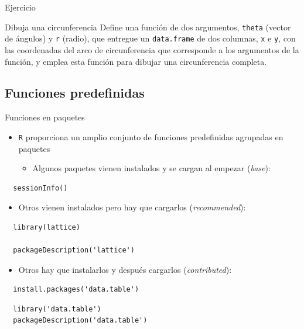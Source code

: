 \documentclass[xcolor={usenames,svgnames,dvipsnames}]{beamer}
\begin{document}
\begin{frame}[fragile,label={sec:org430984a}]{Ejercicio}
 \begin{block}{Dibuja una circunferencia}
Define una función de dos argumentos, \texttt{theta} (vector de ángulos) y
\texttt{r} (radio), que entregue un \texttt{data.frame} de dos columnas, \texttt{x} e \texttt{y},
con las coordenadas del arco de circunferencia que corresponde a los
argumentos de la función, y emplea esta función para dibujar una
circunferencia completa.
\end{block}
\end{frame}


\subsection{Funciones predefinidas}
\label{sec:org2401417}

\begin{frame}[fragile,label={sec:orgfcd5ee0}]{Funciones en paquetes}
 \begin{itemize}
\item \texttt{R} proporciona un amplio conjunto de funciones predefinidas agrupadas en paquetes

\begin{itemize}
\item Algunos paquetes vienen instalados y se cargan al empezar (\emph{base}):
\end{itemize}
\end{itemize}
\lstset{language=r,label= ,caption= ,captionpos=b,numbers=none}
\begin{lstlisting}
  sessionInfo()
\end{lstlisting}
\begin{itemize}
\item Otros vienen instalados pero hay que cargarlos (\emph{recommended}):
\end{itemize}
\lstset{language=r,label= ,caption= ,captionpos=b,numbers=none}
\begin{lstlisting}
  library(lattice)

  packageDescription('lattice')
\end{lstlisting}
\begin{itemize}
\item Otros hay que instalarlos y después cargarlos (\emph{contributed}):
\end{itemize}
\lstset{language=r,label= ,caption= ,captionpos=b,numbers=none}
\begin{lstlisting}
  install.packages('data.table')
\end{lstlisting}

\lstset{language=r,label= ,caption= ,captionpos=b,numbers=none}
\begin{lstlisting}
  library('data.table')
  packageDescription('data.table')
\end{lstlisting}
\end{frame}
\end{document}
